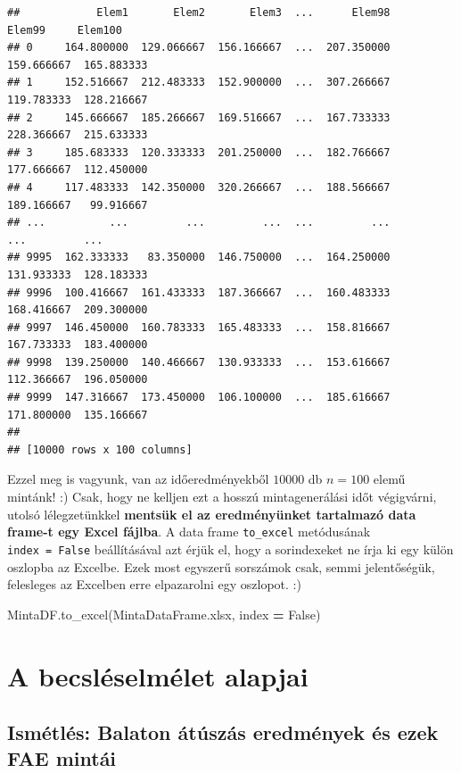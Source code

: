 \documentclass[
]{book}
\newenvironment{Shaded}{\begin{snugshade}}{\end{snugshade}}
\newcommand{\NormalTok}[1]{#1}
\newcommand{\OperatorTok}[1]{\textcolor[rgb]{0.81,0.36,0.00}{\textbf{#1}}}
\newcommand{\StringTok}[1]{\textcolor[rgb]{0.31,0.60,0.02}{#1}}
\newcommand{\VariableTok}[1]{\textcolor[rgb]{0.00,0.00,0.00}{#1}}
\begin{document}
\begin{verbatim}
##            Elem1       Elem2       Elem3  ...      Elem98      Elem99     Elem100
## 0     164.800000  129.066667  156.166667  ...  207.350000  159.666667  165.883333
## 1     152.516667  212.483333  152.900000  ...  307.266667  119.783333  128.216667
## 2     145.666667  185.266667  169.516667  ...  167.733333  228.366667  215.633333
## 3     185.683333  120.333333  201.250000  ...  182.766667  177.666667  112.450000
## 4     117.483333  142.350000  320.266667  ...  188.566667  189.166667   99.916667
## ...          ...         ...         ...  ...         ...         ...         ...
## 9995  162.333333   83.350000  146.750000  ...  164.250000  131.933333  128.183333
## 9996  100.416667  161.433333  187.366667  ...  160.483333  168.416667  209.300000
## 9997  146.450000  160.783333  165.483333  ...  158.816667  167.733333  183.400000
## 9998  139.250000  140.466667  130.933333  ...  153.616667  112.366667  196.050000
## 9999  147.316667  173.450000  106.100000  ...  185.616667  171.800000  135.166667
## 
## [10000 rows x 100 columns]
\end{verbatim}

Ezzel meg is vagyunk, van az időeredményekből \(10000\) db \(n=100\) elemű mintánk! :) Csak, hogy ne kelljen ezt a hosszú mintagenerálási időt végigvárni, utolsó lélegzetünkkel \textbf{mentsük el az eredményünket tartalmazó data frame-t egy Excel fájlba}. A data frame \texttt{to\_excel} metódusának \texttt{index\ =\ False} beállításával azt érjük el, hogy a sorindexeket ne írja ki egy külön oszlopba az Excelbe. Ezek most egyszerű sorszámok csak, semmi jelentőségük, felesleges az Excelben erre elpazarolni egy oszlopot. :)

\begin{Shaded}
\begin{Highlighting}[]
\NormalTok{MintaDF.to\_excel(}\StringTok{\textquotesingle{}MintaDataFrame.xlsx\textquotesingle{}}\NormalTok{, index }\OperatorTok{=} \VariableTok{False}\NormalTok{)}
\end{Highlighting}
\end{Shaded}

\chapter{A becsléselmélet alapjai}\label{a-becsluxe9selmuxe9let-alapjai}

\section{Ismétlés: Balaton átúszás eredmények és ezek FAE mintái}\label{ismuxe9tluxe9s-balaton-uxe1tuxfaszuxe1s-eredmuxe9nyek-uxe9s-ezek-fae-mintuxe1i}
\end{document}
